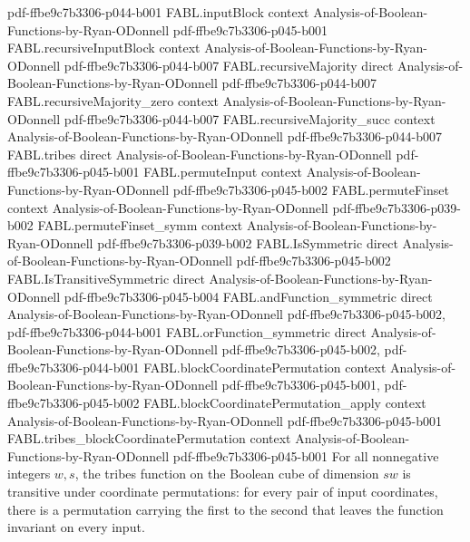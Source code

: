 \begin{theorem}
  {pdf-ffbe9c7b3306-p044-b001}
\proofstep
  {FABL.inputBlock}
  {context}
  {Analysis-of-Boolean-Functions-by-Ryan-ODonnell}
  {pdf-ffbe9c7b3306-p045-b001}
\proofstep
  {FABL.recursiveInputBlock}
  {context}
  {Analysis-of-Boolean-Functions-by-Ryan-ODonnell}
  {pdf-ffbe9c7b3306-p044-b007}
\proofstep
  {FABL.recursiveMajority}
  {direct}
  {Analysis-of-Boolean-Functions-by-Ryan-ODonnell}
  {pdf-ffbe9c7b3306-p044-b007}
\proofstep
  {FABL.recursiveMajority_zero}
  {context}
  {Analysis-of-Boolean-Functions-by-Ryan-ODonnell}
  {pdf-ffbe9c7b3306-p044-b007}
\proofstep
  {FABL.recursiveMajority_succ}
  {context}
  {Analysis-of-Boolean-Functions-by-Ryan-ODonnell}
  {pdf-ffbe9c7b3306-p044-b007}
\proofstep
  {FABL.tribes}
  {direct}
  {Analysis-of-Boolean-Functions-by-Ryan-ODonnell}
  {pdf-ffbe9c7b3306-p045-b001}
\proofstep
  {FABL.permuteInput}
  {context}
  {Analysis-of-Boolean-Functions-by-Ryan-ODonnell}
  {pdf-ffbe9c7b3306-p045-b002}
\proofstep
  {FABL.permuteFinset}
  {context}
  {Analysis-of-Boolean-Functions-by-Ryan-ODonnell}
  {pdf-ffbe9c7b3306-p039-b002}
\proofstep
  {FABL.permuteFinset_symm}
  {context}
  {Analysis-of-Boolean-Functions-by-Ryan-ODonnell}
  {pdf-ffbe9c7b3306-p039-b002}
\proofstep
  {FABL.IsSymmetric}
  {direct}
  {Analysis-of-Boolean-Functions-by-Ryan-ODonnell}
  {pdf-ffbe9c7b3306-p045-b002}
\proofstep
  {FABL.IsTransitiveSymmetric}
  {direct}
  {Analysis-of-Boolean-Functions-by-Ryan-ODonnell}
  {pdf-ffbe9c7b3306-p045-b004}
\proofstep
  {FABL.andFunction_symmetric}
  {direct}
  {Analysis-of-Boolean-Functions-by-Ryan-ODonnell}
  {pdf-ffbe9c7b3306-p045-b002,
    pdf-ffbe9c7b3306-p044-b001}
\proofstep
  {FABL.orFunction_symmetric}
  {direct}
  {Analysis-of-Boolean-Functions-by-Ryan-ODonnell}
  {pdf-ffbe9c7b3306-p045-b002,
    pdf-ffbe9c7b3306-p044-b001}
\proofstep
  {FABL.blockCoordinatePermutation}
  {context}
  {Analysis-of-Boolean-Functions-by-Ryan-ODonnell}
  {pdf-ffbe9c7b3306-p045-b001,
    pdf-ffbe9c7b3306-p045-b002}
\proofstep
  {FABL.blockCoordinatePermutation_apply}
  {context}
  {Analysis-of-Boolean-Functions-by-Ryan-ODonnell}
  {pdf-ffbe9c7b3306-p045-b001}
\proofstep
  {FABL.tribes_blockCoordinatePermutation}
  {context}
  {Analysis-of-Boolean-Functions-by-Ryan-ODonnell}
  {pdf-ffbe9c7b3306-p045-b001}
For all nonnegative integers $w,s$, the tribes function on the Boolean cube of dimension
$sw$ is transitive under coordinate permutations: for every pair of input coordinates,
there is a permutation carrying the first to the second that leaves the function
invariant on every input.
\end{theorem}

